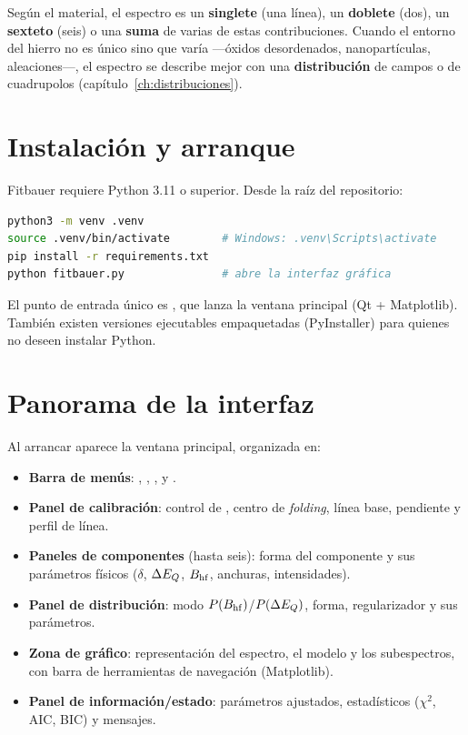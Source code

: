 Según el material, el espectro es un \textbf{singlete} (una línea), un
\textbf{doblete} (dos), un \textbf{sexteto} (seis) o una \textbf{suma} de varias
de estas contribuciones. Cuando el entorno del hierro no es único sino que varía
—óxidos desordenados, nanopartículas, aleaciones—, el espectro se describe mejor
con una \textbf{distribución} de campos o de cuadrupolos
(capítulo~\ref{ch:distribuciones}).

\section{Instalación y arranque}

Fitbauer requiere Python 3.11 o superior. Desde la raíz del repositorio:

\begin{lstlisting}[language=bash]
python3 -m venv .venv
source .venv/bin/activate        # Windows: .venv\Scripts\activate
pip install -r requirements.txt
python fitbauer.py               # abre la interfaz gráfica
\end{lstlisting}

El punto de entrada único es , que lanza la ventana principal
(Qt + Matplotlib). También existen versiones ejecutables empaquetadas
(PyInstaller) para quienes no deseen instalar Python.

\section{Panorama de la interfaz}
\label{sec:panorama}

Al arrancar aparece la ventana principal, organizada en:

\begin{itemize}[nosep]
  \item \textbf{Barra de menús}: , , ,
         y .
  \item \textbf{Panel de calibración}: control de , centro de
        \emph{folding}, línea base, pendiente y perfil de línea.
  \item \textbf{Paneles de componentes} (hasta seis): forma del componente y sus
        parámetros físicos ($\delta$, $\Delta E_{Q}$, $B_{\mathrm{hf}}$, anchuras, intensidades).
  \item \textbf{Panel de distribución}: modo $P(B_{\mathrm{hf}})$/$P(\Delta E_{Q})$, forma,
        regularizador y sus parámetros.
  \item \textbf{Zona de gráfico}: representación del espectro, el modelo y los
        subespectros, con barra de herramientas de navegación (Matplotlib).
  \item \textbf{Panel de información/estado}: parámetros ajustados, estadísticos
        ($\chi^2$, AIC, BIC) y mensajes.
\end{itemize}

